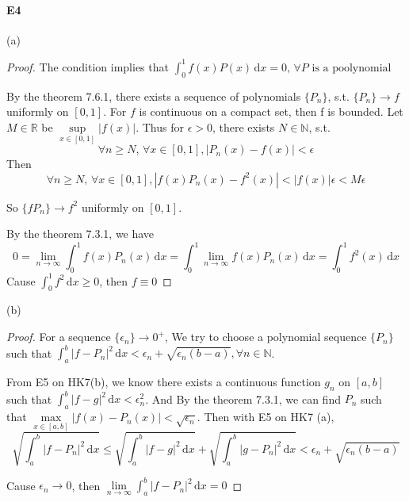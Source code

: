 \documentclass{article}
\begin{document}
\paragraph{E4}
(a)
\begin{proof}
    The condition implies that  $ \int_{0 }^{1} f(x)P(x)\, \mathrm{d}x=0, \,\forall P\text{ is a poolynomial}   $ 

    By the theorem 7.6.1, there exists a sequence of polynomials  $ \{P_n \} $, s.t. $ \{P_n\}\rightarrow f$ uniformly on $ [0,1]$. For  $ f  $ is continuous on a compact set, then f is bounded. Let  $ M\in \mathbb{R} $ be  $ \sup\limits_{x\in[0,1]}|f(x)| $.  Thus for  $ \epsilon>0 $, there exists  $ N\in \mathbb{N }  $, s.t.
    \[\forall n\geqslant N ,\,\forall x\in[0,1], |P_n(x)-f(x)|<\epsilon\]
    Then 
    \[\forall n\geqslant N ,\,\forall x\in[0,1], |f(x)P_n(x)-f^2(x)|<|f(x)|\epsilon<M\epsilon\]
    
    So  $ \{fP_n\}\rightarrow f^2$ uniformly on $ [0,1]$.

    By the theorem 7.3.1, we have 
    \[0=\lim\limits_{n\to\infty}\int_{0}^{1 } f(x)P_n(x)\, \mathrm{d}x=\int_{0 }^{1} \lim\limits_{n\to\infty}f(x)P_n(x)\, \mathrm{d}x=\int_{0}^{1} f^2(x)\, \mathrm{d}x  \]
    Cause  $ \int_{0}^{1} f^2\, \mathrm{d}x \geqslant 0  $, then  $ f\equiv0 $  
\end{proof}
(b)
\begin{proof}
    For a sequence  $ \{\epsilon_n\}\rightarrow0^+   $, We try to choose  a polynomial sequence $ \{P_n\} $ such that  $ \int_{a }^{b } |f-P_n|^2\, \mathrm{d}x<\epsilon_n+\sqrt{\epsilon_n(b-a)}, \forall n\in \mathbb{N }   $.
    
    From E5 on HK7(b), we know there exists a continuous function  $ g_n  $ on  $ [a,b] $ such that  $ \int_{a }^{b } |f-g|^2\, \mathrm{d}x <\epsilon_n^2   $. And By the theorem 7.3.1, we can find  $ P_n  $ such that   $ \max\limits_{x\in[a,b]}|f(x)-P_n(x)|<\sqrt{\epsilon_n} $.
    Then with E5 on HK7 (a),  \[ \sqrt{\int_{a }^{b } |f-P_n|^2\, \mathrm{d}x} \leqslant \sqrt{\int_{a }^{b } |f-g|^2\, \mathrm{d}x  }+\sqrt{\int_{a }^{b } |g-P_n|^2\, \mathrm{d}x  }<\epsilon_n+\sqrt{\epsilon_n(b-a)} \] 
    
    Cause  $ \epsilon_n\rightarrow0  $, then  $ \lim\limits_{n\to\infty}  \int_{a }^{ b } |f-P_n|^2\, \mathrm{d}x=0   $ 
\end{proof}
\end{document}

